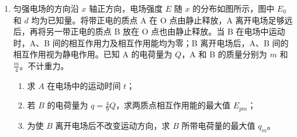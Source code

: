 \documentclass[\gkver]{gaokaozhenti}
\begin{document}
\begin{enumerate}
{$F_{1}=m(g+a_{1})=2.0\times10^{3}\times(10+1.0)\UN=2.2\times10^{4}\UN$

$F_{2}=m(g+a_{2})=2.0\times10^{3}\times(10-1.0)\UN=1.8\times10^{4}\UN$

（2）类比可得，所求速度变化量等于第 1 s 内 $a-t$ 图线下的面积 $\Delta v_{1}=0.50\Ums$。同理可得 $\Delta v_{2}=v_{2}-v_{0}=1.5\Ums$，$v_{0}=0$，第 2 s 末的速率 $v_{2}=1.5\Ums$。

（3）由 $a-t$ 图像可知，11 s\textasciitilde{}30 s 内速率最大，其值等于 0\textasciitilde{}11 s 内 $a-t$ 图线下的面积，有 $v_{m}=10\Ums$。此时电梯做匀速运动，拉力 $F$ 等于重力 $mg$，所求功率 $P=Fv_{m}=mg\cdot v_{m}=2.0\times10^{3}\times10\times10\UW=2.0\times10^{5}\UW$。由动能定理，总功 $W = E_{k2} - E_{k1} = \frac{1}{2}mv_{m}^{2} = \frac{1}{2} \times 2.0 \times 10^{3} \times 10^{2}\UJ = 1.0 \times 10^{5}\UJ$。
}

\item
匀强电场的方向沿 $x$ 轴正方向，电场强度 $E$ 随 $x$ 的分布如图所示，图中 $E_{0}$ 和 $d$ 均为已知量。将带正电的质点 A 在 O 点由静止释放，A 离开电场足够远后，再将另一带正电的质点 B 放在 O 点也由静止释放。当 B 在电场中运动时，A、B 间的相互作用力及相互作用能均为零；B 离开电场后，A、B 间的相互作用视为静电作用。已知 A 的电荷量为 $Q$，A 和 B 的质量分别为 $m$ 和 $\frac{m}{4}$。不计重力。
\begin{enumerate}
	\item
	求 $A$ 在电场中的运动时间 $t$；
	\item
	若 $B$ 的电荷量为 $q=\frac{4}{9}Q$，求两质点相互作用能的最大值 $E_{pm}$；
	\item
	为使 $B$ 离开电场后不改变运动方向，求 $B$ 所带电荷量的最大值 $q_{m}$。
\end{enumerate}
\end{enumerate}
\end{document}
